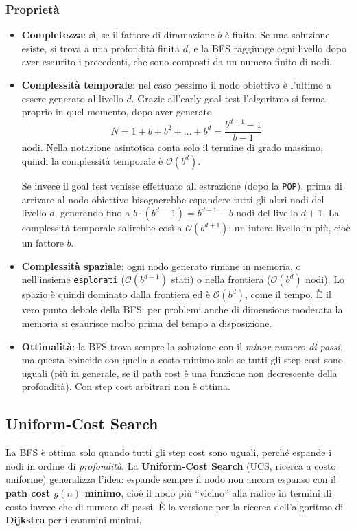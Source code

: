 \documentclass[a4paper, 11pt, oneside]{book}
\theoremstyle{definition}
\begin{document}
	\subsubsection*{Propriet\`a}
	\begin{itemize}
		\item \textbf{Completezza}: s\`i, se il fattore di diramazione $b$ \`e finito.
			Se una soluzione esiste, si trova a una profondit\`a finita $d$, e la BFS
			raggiunge ogni livello dopo aver esaurito i precedenti, che sono composti da un
			numero finito di nodi.

		\item \textbf{Complessit\`a temporale}: nel caso pessimo il nodo obiettivo \`e
			l'ultimo a essere generato al livello $d$. Grazie all'early goal test
			l'algoritmo si ferma proprio in quel momento, dopo aver generato
			\[
				N = 1 + b + b^2 + \dots + b^d = \frac{b^{d+1} - 1}{b - 1}
			\]
			nodi. Nella notazione asintotica conta solo il termine di grado massimo, quindi
			la complessit\`a temporale \`e $\mathcal{O}(b^d)$.

			Se invece il goal test venisse effettuato all'estrazione (dopo la
			\texttt{POP}), prima di arrivare al nodo obiettivo bisognerebbe espandere tutti
			gli altri nodi del livello $d$, generando fino a $b \cdot (b^d - 1) = b^{d+1} - b$
			nodi del livello $d+1$. La complessit\`a temporale salirebbe cos\`i a
			$\mathcal{O}(b^{d+1})$: un intero livello in pi\`u, cio\`e un fattore $b$.

		\item \textbf{Complessit\`a spaziale}: ogni nodo generato rimane in memoria, o
			nell'insieme \texttt{esplorati} ($\mathcal{O}(b^{d-1})$ stati) o nella
			frontiera ($\mathcal{O}(b^d)$ nodi). Lo spazio \`e quindi dominato dalla
			frontiera ed \`e $\mathcal{O}(b^d)$, come il tempo. \`E il vero punto debole
			della BFS: per problemi anche di dimensione moderata la memoria si esaurisce
			molto prima del tempo a disposizione.

		\item \textbf{Ottimalit\`a}: la BFS trova sempre la soluzione con il \emph{minor
			numero di passi}, ma questa coincide con quella a costo minimo solo se tutti gli
			step cost sono uguali (pi\`u in generale, se il path cost \`e una funzione non
			decrescente della profondit\`a). Con step cost arbitrari non \`e ottima.
	\end{itemize}
	\subsection{Uniform-Cost Search}
	La BFS \`e ottima solo quando tutti gli step cost sono uguali, perch\'e espande i nodi
	in ordine di \emph{profondit\`a}. La \textbf{Uniform-Cost Search} (UCS, ricerca a costo
	uniforme) generalizza l'idea: espande sempre il nodo non ancora espanso con il
	\textbf{path cost $g(n)$ minimo}, cio\`e il nodo pi\`u ``vicino'' alla radice in termini
	di costo invece che di numero di passi. \`E la versione per la ricerca dell'algoritmo di
	\textbf{Dijkstra} per i cammini minimi.
\end{document}

